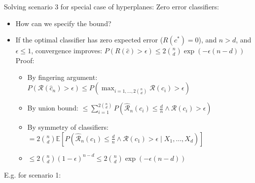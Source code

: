 Solving scenario 3 for special case of hyperplanes: Zero error classifiers:
\begin{itemize}
    \item How can we specify the bound?
    \item If the optimal classifier has zero expected error ($ R(c^*) = 0 $), and $n > d$, and $\epsilon \leq 1$, convergence improves:
    $
    P\left(R(\hat{c}) > \epsilon\right) \leq 2 \binom{n}{d} \exp\left(-\epsilon(n - d)\right)
    $\\
    Proof:
    \begin{itemize}
        \item By fingering argument: $
        P(\mathcal{R}(\hat{c}_n) > \epsilon) \leq P\left(\max_{i=1,\dots,2\binom{n}{d}} \mathcal{R}(c_i) > \epsilon\right)
        $
        \item By union bound: $
        \leq \sum_{i=1}^{2\binom{n}{d}} P\left(\hat{\mathcal{R}}_n(c_i) \leq \frac{d}{n} \land \mathcal{R}(c_i) > \epsilon\right)
        $
        \item By symmetry of classifiers: $
        = 2\binom{n}{d} \mathbb{E}\left[P\left(\hat{\mathcal{R}}_n(c_1) \leq \frac{d}{n} \land \mathcal{R}(c_1) > \epsilon \mid X_1, \dots, X_d\right)\right]
        $
        \item $
        \leq 2\binom{n}{d} (1 - \epsilon)^{n - d} \leq 2\binom{n}{d} \exp(-\epsilon(n - d))
        $
    \end{itemize}
\end{itemize}
E.g. for scenario 1: 
